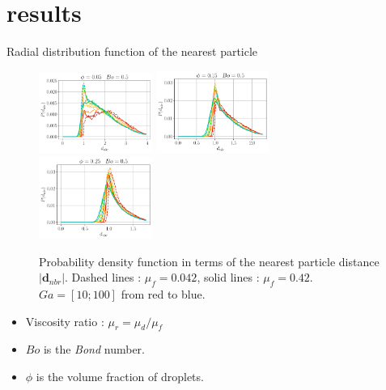 \documentclass{sintefbeamer}
\begin{document}
\section*{results}
\begin{frame}{Radial distribution function of the nearest particle}
  \begin{figure}[h!]
    \centering
    \includegraphics[width=0.33\textwidth]{image/N_10/Pcond/probaNBo0_5PHI0_05.pdf}
    \includegraphics[width=0.33\textwidth]{image/N_10/Pcond/probaNBo0_5PHI0_15.pdf}
    \includegraphics[width=0.33\textwidth]{image/N_10/Pcond/probaNBo0_5PHI0_25.pdf}
    \caption{Probability density function in terms of the nearest particle distance $|\bm{d}_{nbr}|$. Dashed lines : $\mu_f = 0.042$, solid lines : $\mu_f = 0.42$. $Ga = [10; 100]$ from red to blue. }  
    \label{fig:Pdmin}
\end{figure}
\begin{itemize}
  \item Viscosity ratio : $\mu_r = \mu_d / \mu_f$ 
  \item $Bo$ is the \textit{Bond} number.  
  \item $\phi$ is the volume fraction of droplets.  
\end{itemize}
\end{frame}
\end{document}
